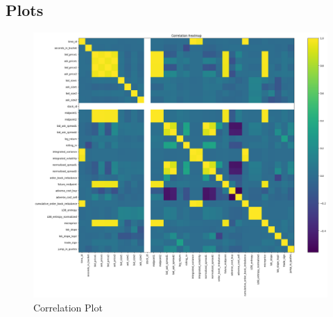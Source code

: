 \documentclass[
  letterpaper,
  DIV=11,
  numbers=noendperiod]{scrartcl}
\begin{document}
\subsection{Plots}\label{plots}

\begin{figure}[H]

{\centering \includegraphics[width=1\textwidth,height=\textheight]{Corr-1.png}

}

\caption{Correlation Plot}

\end{figure}%
\end{document}
